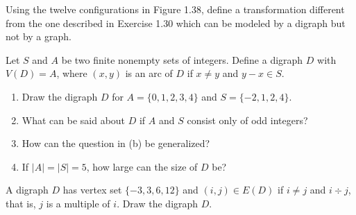 \begin{exer}
Using the twelve configurations in Figure 1.38, define a transformation different from the one described in Exercise 1.30 which can be modeled by a digraph but not by a graph.
\end{exer}

\begin{exer}
Let $S$ and $A$ be two finite nonempty sets of integers. Define a digraph $D$ with $V(D) = A$, where $(x,y)$ is an arc of $D$ if $x \neq y$ and $y-x \in S$.
\begin{enumerate}[{(a)}]
\item Draw the digraph $D$ for $A = \{0,1,2,3,4\}$ and $S = \{-2,1,2,4\}$.
\item What can be said about $D$ if $A$ and $S$ consist only of odd integers?
\item How can the question in (b) be generalized?
\item If $|A| = |S| = 5$, how large can the size of $D$ be?
\end{enumerate}
\end{exer}

\begin{exer}
A digraph $D$ has vertex set $\{-3,3,6,12\}$ and $(i,j) \in E(D)$ if $i \neq j$ and $i \div j$, that is, $j$ is a multiple of $i$. Draw the digraph $D$.
\end{exer}
